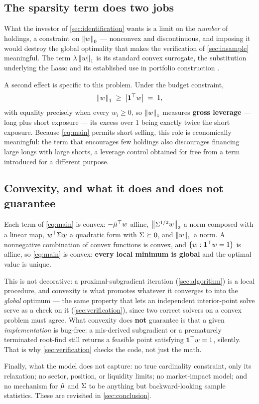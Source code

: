 \subsection{The sparsity term does two jobs}

What the investor of \cref{sec:identification} wants is a limit on the \emph{number} of holdings,
a constraint on $\left\lVert w \right\rVert_0$ --- nonconvex and discontinuous, and imposing it would destroy the
global optimality that makes the verification of \cref{sec:insample} meaningful. The term
$\lambda\left\lVert w \right\rVert_1$ is its standard convex surrogate, the substitution underlying the Lasso
\citep{tibshirani1996} and its established use in portfolio construction \citep{brodie2009}.

A second effect is specific to this problem. Under the budget constraint,
\begin{equation}\label{eq:leverage}
\left\lVert w \right\rVert_1 \;\ge\; \bigl|\mathbf{1}^\top w\bigr| \;=\; 1 ,
\end{equation}
with equality precisely when every $w_i \ge 0$, so $\left\lVert w \right\rVert_1$ measures \textbf{gross
leverage} --- long plus short exposure --- its excess over $1$ being exactly twice the short
exposure. Because \cref{eq:main} permits short selling, this role is economically meaningful: the
term that encourages few holdings also discourages financing large longs with large shorts, a
leverage control obtained for free from a term introduced for a different purpose.

\subsection{Convexity, and what it does and does not guarantee}

Each term of \cref{eq:main} is convex: $-\hat{\mu}^\top w$ affine, $\left\lVert \Sigma^{1/2} w \right\rVert_2$ a norm
composed with a linear map, $w^\top\Sigma w$ a quadratic form with $\Sigma \succeq 0$, and
$\left\lVert w \right\rVert_1$ a norm. A nonnegative combination of convex functions is convex, and
$\{w : \mathbf{1}^\top w = 1\}$ is affine, so \cref{eq:main} is convex: \textbf{every local minimum is
global} and the optimal value is unique.

This is not decorative: a proximal-subgradient iteration (\cref{sec:algorithm}) is a local
procedure, and convexity is what promotes whatever it converges to into the \emph{global}
optimum --- the same property that lets an independent interior-point solve serve as a check on
it (\cref{sec:verification}), since two correct solvers on a convex problem must agree. What
convexity does \textbf{not} guarantee is that a given \emph{implementation} is bug-free: a
mis-derived subgradient or a prematurely terminated root-find still returns a feasible point
satisfying $\mathbf{1}^\top w = 1$, silently. That is why \cref{sec:verification} checks the code, not
just the math.

Finally, what the model does not capture: no true cardinality constraint, only its relaxation; no
sector, position, or liquidity limits; no market-impact model; and no mechanism for $\hat{\mu}$ and
$\Sigma$ to be anything but backward-looking sample statistics. These are revisited in
\cref{sec:conclusion}.

